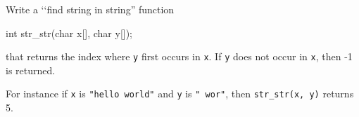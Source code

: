 Write a \lq\lq find string in string'' function
\begin{console}
int str_str(char x[], char y[]);
\end{console}
that returns the index where \verb!y! first occurs in \verb!x!.
If \verb!y! does not occur in \verb!x!, then -1 is returned.

For instance if \verb!x! is \verb!"hello world"!
and \verb!y! is \verb!" wor"!, then
\verb!str_str(x, y)! returns 5.

